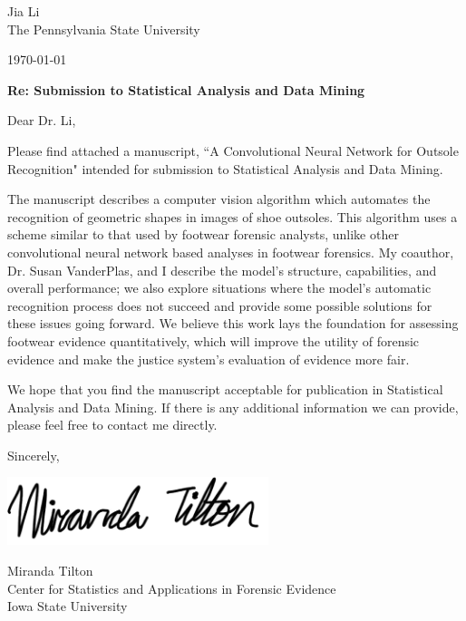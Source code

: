 \documentclass[11pt]{article}
\begin{document}
Jia Li \\
The Pennsylvania State University

\vspace{2em}

\today\\\vspace{1em}

{\bf Re: Submission to Statistical Analysis and Data Mining}\\\vspace{2em}

Dear Dr. Li, \vspace{1em}

Please find attached a manuscript, ``A Convolutional Neural Network for Outsole Recognition" intended for submission to Statistical Analysis and Data Mining. \vspace{1em}

The manuscript describes a computer vision algorithm which automates the recognition of geometric shapes in images of shoe outsoles. This algorithm uses a scheme similar to that used by footwear forensic analysts, unlike other convolutional neural network based analyses in footwear forensics. My coauthor, Dr. Susan VanderPlas, and I describe the model's structure, capabilities, and overall performance; we also explore situations where the model's automatic recognition process does not succeed and provide some possible solutions for these issues going forward. We believe this work lays the foundation for assessing footwear evidence quantitatively, which will improve the utility of forensic evidence and make the justice system's evaluation of evidence more fair. \vspace{1em}

We hope that you find the manuscript acceptable for publication in Statistical Analysis and Data Mining. If there is any additional information we can provide, please feel free to contact me directly. \vspace{0.25in}

Sincerely,\\
\begin{minipage}{.25\linewidth}
\vspace*{.5cm}
\includegraphics[width=3in,keepaspectratio=TRUE]{signature}
\vspace*{.5cm}
\end{minipage}

Miranda Tilton\\
Center for Statistics and Applications in Forensic Evidence\\
Iowa State University
\end{document}

